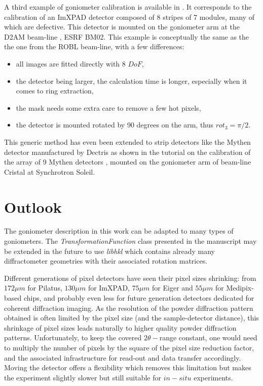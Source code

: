 \documentclass[preprint]{iucr}              %
\begin{document}
A third example of goniometer calibration is available in \cite{rotation_xpad}. 
It corresponds to the calibration of an ImXPAD detector \cite{BOUDET200341}
composed of 8 stripes of 7 modules, many of which are defective.
This detector is mounted on the goniometer arm at the D2AM beam-line
\cite{Ferrer:ri0008}, ESRF BM02. 
This example is conceptually the same as the the one from the ROBL beam-line,
with a few differences:
\begin{itemize}
  \item all images are fitted directly with 8 $DoF$,
  \item the detector being larger, the calculation time is
        longer, especially when it comes to ring extraction,
  \item the mask needs some extra care to remove a few hot pixels,
  \item the detector is mounted rotated by 90 degrees on the arm, thus $rot_3=\pi/2$.
\end{itemize}

This generic method has even been extended to strip detectors 
like the Mythen detector manufactured by Dectris as shown in the tutorial on the 
calibration of the array of 9 Mythen detectors \cite{rotation_mythen}, mounted on 
the goniometer arm of beam-line Cristal at Synchrotron Soleil.  

\section{Outlook}

The goniometer description in this work can be adapted to
many types of goniometers.
The \textit{TransformationFunction} class presented in the manuscript may be extended
in the future to use \textit{libhkl} \cite{libhkl} which contains already many
diffractometer geometries with their associated rotation matrices. 

Different generations of pixel detectors have seen their pixel sizes
shrinking:
from $172 \mu m$ for Pilatus, $130 \mu m$ for ImXPAD, $75 \mu m$ for 
Eiger and $55 \mu m$ for Medipix-based chips, and probably even less for
future generation detectors dedicated for coherent diffraction imaging.
As the resolution of the powder diffraction pattern obtained is often limited by the
pixel size (and the sample-detector distance), this shrinkage of
pixel sizes leads naturally to higher quality powder
diffraction patterns.
Unfortunately, to keep the covered $2\theta-$range constant, one would need
to multiply the number of pixels by the square of the pixel size reduction
factor, and the associated infrastructure for read-out and data transfer
accordingly.
Moving the detector offers a flexibility which removes this
limitation but makes the experiment slightly slower but still suitable  
for $in-situ$ experiments.
\end{document}
